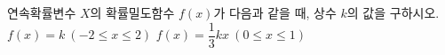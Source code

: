 연속확률변수 $X$의 확률밀도함수 $f(x)$가 다음과 같을 때, 상수 $k$의 값을 구하시오.
 $f(x)=k\ (-2\le x\le 2)$
 $f(x)=\dfrac{1}{3}kx\ (0\le x\le 1)$
